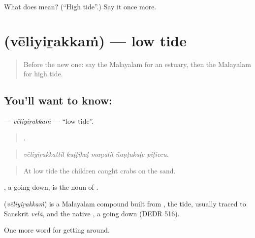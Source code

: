 \begin{tcolorbox}[breakable,colback=teal!4,colframe=teal!35!black,title={Before you move on}]
What does  mean? (\textquotedblleft{}High tide\textquotedblright{}.) Say it once more.
\end{tcolorbox}
\section[\texorpdfstring{\ml{വേലിയിറക്കം} (vēliyiṟakkaṁ)}{വേലിയിറക്കം (vēliyiṟakkaṁ)}]{ (vēliyiṟakkaṁ) — low tide}

\label{lesson:ML-C497-veliyirakkam}



\begin{quote}
Before the new one: say the Malayalam for an estuary, then the Malayalam for high tide.
\end{quote}

\subsection*{You'll want to know: }
\textbf{} — \emph{vēliyiṟakkaṁ} — \textquotedblleft{}low tide\textquotedblright{}.

\begin{quote}
    .
\end{quote}

\begin{quote}
\emph{vēliyiṟakkattil kuṭṭikaḷ maṇalil ñaṇṭukaḷe piṭiccu.}
\end{quote}

\begin{quote}
At low tide the children caught crabs on the sand.
\end{quote}

, a going down, is the noun of .

\begin{cousinweb}
\textbf{} (\emph{vēliyiṟakkaṁ}) is a Malayalam compound built from , the tide, usually traced to Sanskrit \emph{velā}, and the native , a going down (DEDR 516).
\end{cousinweb}

\begin{grammarlens}[title={What you've built}]
One more word for getting around.
\end{grammarlens}

